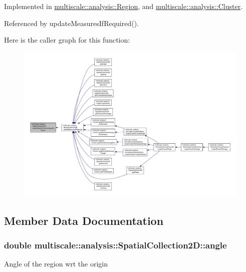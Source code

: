 Implemented in \hyperlink{classmultiscale_1_1analysis_1_1Region_ac382fb7a5625d7ef573a311b8de8f248}{multiscale\-::analysis\-::\-Region}, and \hyperlink{classmultiscale_1_1analysis_1_1Cluster_aee8272e740fe640a6bf5260746d34080}{multiscale\-::analysis\-::\-Cluster}.



Referenced by update\-Measures\-If\-Required().



Here is the caller graph for this function\-:
\nopagebreak
\begin{figure}[H]
\begin{center}
\leavevmode
\includegraphics[width=350pt]{classmultiscale_1_1analysis_1_1SpatialCollection2D_ad94bce09032b184ebfd5b5006217c683_icgraph}
\end{center}
\end{figure}




\subsection{Member Data Documentation}
\hypertarget{classmultiscale_1_1analysis_1_1SpatialCollection2D_ab452753ab21ee26732afb77a6478b3ce}{
\subsubsection[{angle}]{\setlength{\rightskip}{0pt plus 5cm}double multiscale\-::analysis\-::\-Spatial\-Collection2\-D\-::angle\hspace{0.3cm}{\ttfamily [protected]}}}\label{classmultiscale_1_1analysis_1_1SpatialCollection2D_ab452753ab21ee26732afb77a6478b3ce}
Angle of the region wrt the origin 

